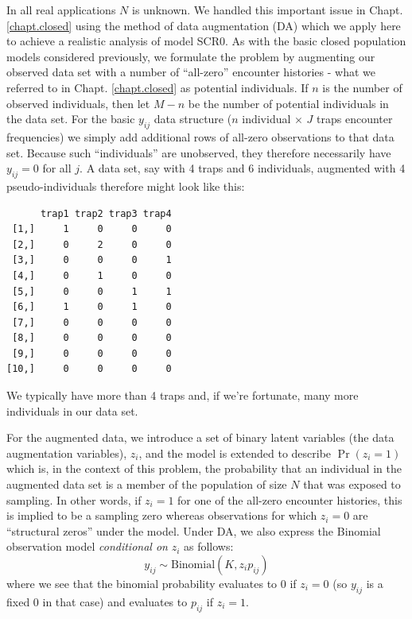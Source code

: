 In all real applications $N$ is unknown.
 We handled this
important issue in Chapt. \ref{chapt.closed} using the method of data augmentation
(DA) which we apply here to achieve a realistic analysis of model SCR0. As
with the basic closed population models considered previously, we
formulate the problem  by augmenting our observed data set with a
number of ``all-zero'' encounter histories - what we referred to in
Chapt. \ref{chapt.closed} as potential individuals. If $n$ is the number of observed
individuals, then let $M-n$ be the number of potential individuals in
the data set. For the basic $y_{ij}$ data structure ($n$ individual $\times$
$J$ traps encounter frequencies) we simply add additional rows of all-zero
observations to that data set. Because such
``individuals'' are unobserved, they  therefore necessarily have
$y_{ij}=0$ for all $j$.  A data set, say with 4 traps and 6 individuals,
augmented with 4 pseudo-individuals therefore might look like this:
{\small
\begin{verbatim}
      trap1 trap2 trap3 trap4
 [1,]     1     0     0     0
 [2,]     0     2     0     0
 [3,]     0     0     0     1
 [4,]     0     1     0     0
 [5,]     0     0     1     1
 [6,]     1     0     1     0
 [7,]     0     0     0     0
 [8,]     0     0     0     0
 [9,]     0     0     0     0
[10,]     0     0     0     0
\end{verbatim}
}
We typically have more than 4 traps and, if we're fortunate, many more
individuals in our data set.

For the augmented data, we introduce a set of binary latent variables
(the data augmentation variables), $z_{i}$, and the model is extended
to describe $\Pr(z_{i} = 1)$ which is, in the context of this problem,
the probability that an individual in the augmented data set is a
member of the population of size $N$ that was exposed to sampling. In
other words, if $z_{i}=1$ for one of the all-zero encounter histories,
this is implied to be a sampling zero whereas observations for which
$z_{i}=0$ are ``structural zeros'' under the model.  Under DA, we also
express the Binomial observation model {\it conditional on} $z_{i}$ as
follows:
\[
	y_{ij} \sim \mbox{Binomial}(K, z_{i} p_{ij})
\]
where we see that the binomial probability evaluates to 0 if $z_{i}=0$
(so $y_{ij}$ is a fixed 0 in that case)
and evaluates to $p_{ij}$ if $z_{i} = 1$.

